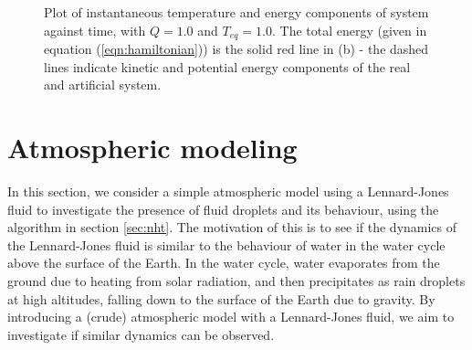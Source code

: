 \documentclass[a4paper,10pt]{article}
\begin{document}
\begin{figure}[htp]
\centering
{}
\caption{Plot of instantaneous temperature and energy components of system against time, with $Q = 1.0$ and $T_{eq}=1.0$. The total energy (given in equation (\ref{eqn:hamiltonian})) is the solid red line in (b) - the dashed lines indicate kinetic and potential energy components of the real and artificial system.}
\label{fig:NHres}
\end{figure}

\section{Atmospheric modeling}
\label{sec:atmod}

In this section, we consider a simple atmospheric model using a Lennard-Jones fluid to investigate the presence of fluid droplets and its behaviour, using the algorithm in section \ref{sec:nht}. The motivation of this is to see if the dynamics of the Lennard-Jones fluid is similar to the behaviour of water in the water cycle above the surface of the Earth. In the water cycle, water evaporates from the ground due to heating from solar radiation, and then precipitates as rain droplets at high altitudes, falling down to the surface of the Earth due to gravity. By introducing a (crude) atmospheric model with a Lennard-Jones fluid, we aim to investigate if similar dynamics can be observed.
\end{document}
